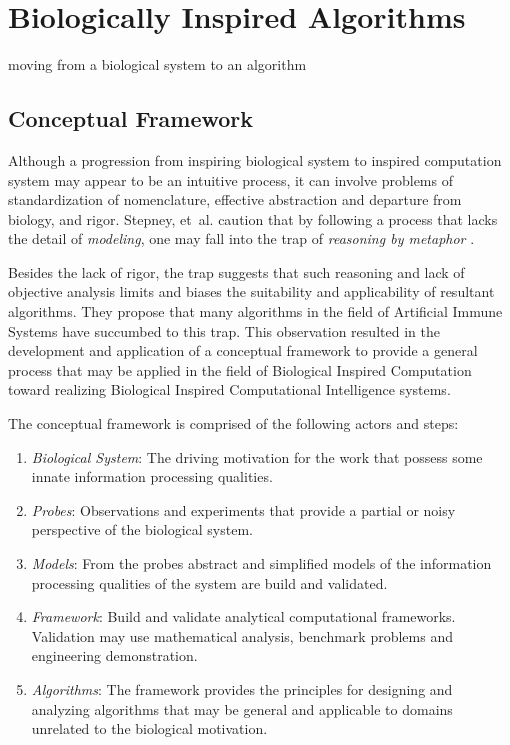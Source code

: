 \documentclass[a4paper, 11pt]{article}
\begin{document}
% 
% 
\section{Biologically Inspired Algorithms}
\label{sub:bia}

moving from a biological system to an algorithm

% 
% 
\subsection{Conceptual Framework}
Although a progression from inspiring biological system to inspired computation system may appear to be an intuitive process, it can involve problems of standardization of nomenclature, effective abstraction and departure from biology, and rigor. Stepney, et~al. caution that by following a process that lacks the detail of \emph{modeling}, one may fall into the trap of \emph{reasoning by metaphor} \cite{Twycross2005, Stepney2004, Stepney2005}. 

Besides the lack of rigor, the trap suggests that such reasoning and lack of objective analysis limits and biases the suitability and applicability of resultant algorithms. They propose that many algorithms in the field of Artificial Immune Systems have succumbed to this trap. This observation resulted in the development and application of a conceptual framework to provide a general process that may be applied in the field of Biological Inspired Computation toward realizing Biological Inspired Computational Intelligence systems. 

The conceptual framework is comprised of the following actors and steps:

\begin{enumerate}
	\item \emph{Biological System}: The driving motivation for the work that possess some innate information processing qualities. 
	\item \emph{Probes}: Observations and experiments that provide a partial or noisy perspective of the biological system.
	\item \emph{Models}: From the probes abstract and simplified models of the information processing qualities of the system are build and validated.
	\item \emph{Framework}: Build and validate analytical computational frameworks. Validation may use mathematical analysis, benchmark problems and engineering demonstration.
	\item \emph{Algorithms}: The framework provides the principles for designing and analyzing algorithms that may be general and applicable to domains unrelated to the biological motivation.
\end{enumerate}
\end{document}
